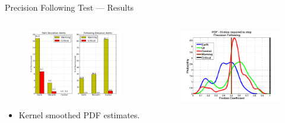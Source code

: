 \documentclass{beamer}
\begin{document}
    \begin{frame}{Precision Following Test --- Results}
      \begin{columns}
        \begin{column}{0.5\textwidth}
          \begin{figure}
            \includegraphics[width=\textwidth]{../graphics/precision_following_alert_percents.png}
          \end{figure}
          \begin{itemize} \footnotesize
            \item Kernel smoothed PDF estimates.
          \end{itemize}
        \end{column}
        \begin{column}{0.5\textwidth}
          \begin{figure}
            \includegraphics[width=\textwidth]{../graphics/precision_following_mu_distribution.png}

\end{figure}
\end{column}
\end{columns}
\end{frame}
\end{document}
